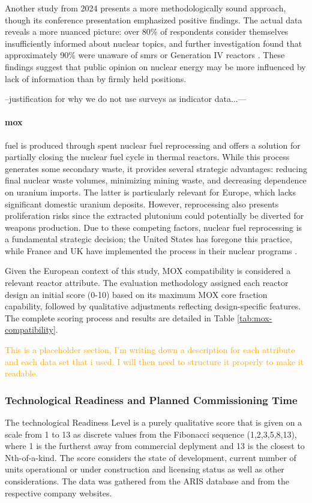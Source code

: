 Another study from 2024 presents a more methodologically sound approach, though its conference presentation emphasized positive findings. The actual data reveals a more nuanced picture: over 80\% of respondents consider themselves insufficiently informed about nuclear topics, and further investigation found that approximately 90\% were unaware of \glspl{smr} or Generation IV reactors \cite{SWG_Nuclear_Survey_2024}. These findings suggest that public opinion on nuclear energy may be more influenced by lack of information than by firmly held positions.

--justification for why we do not use surveys as indicator data...---

\paragraph{\gls{mox}} fuel is produced through spent nuclear fuel reprocessing and offers a solution for partially closing the nuclear fuel cycle in thermal reactors. While this process generates some secondary waste, it provides several strategic advantages: reducing final nuclear waste volumes, minimizing mining waste, and decreasing dependence on uranium imports. The latter is particularly relevant for Europe, which lacks significant domestic uranium deposits. However, reprocessing also presents proliferation risks since the extracted plutonium could potentially be diverted for weapons production. Due to these competing factors, nuclear fuel reprocessing is a fundamental strategic decision; the United States has foregone this practice, while France and UK have implemented the process in their nuclear programs \cite{CRS_Reprocessing_Spent_Fuel_2025}.

Given the European context of this study, MOX compatibility is considered a relevant reactor attribute. The evaluation methodology assigned each reactor design an initial score (0-10) based on its maximum MOX core fraction capability, followed by qualitative adjustments reflecting design-specific features. The complete scoring process and results are detailed in Table \ref{tab:mox-compatibility}.


\textcolor{orange}{This is a placeholder section, I'm writing down a description for each attribute and each data set that i used. I will then need to structure it properly to make it readable.}

\subsubsection{Technological Readiness and Planned Commissioning Time}
The technological Readiness Level is a purely qualitative score that is given on a scale from 1 to 13 as discrete values from the Fibonacci sequence (1,2,3,5,8,13), where 1 is the furtherst away from commercial deplyment and 13 is the closest to Nth-of-a-kind. The score considers the state of development, current number of units operational or under construction and licensing status as well as other considerations. The data was gathered from the ARIS database \cite{iaea2025aris} and from the respective company websites. \\


